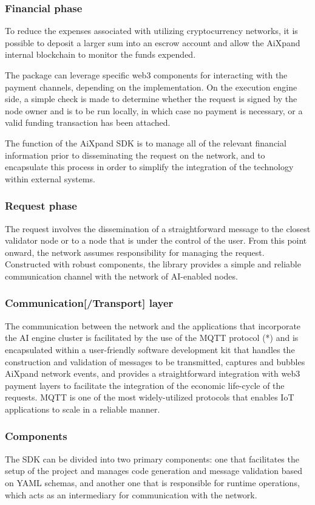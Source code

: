 \documentclass{article}
\begin{document}
\subsubsection{Financial phase}
To reduce the expenses associated with utilizing cryptocurrency networks, it is possible to deposit a larger sum into an escrow account and allow the AiXpand internal blockchain to monitor the funds expended.

The package can leverage specific web3 components for interacting with the payment channels, depending on the implementation. On the execution engine side, a simple check is made to determine whether the request is signed by the node owner and is to be run locally, in which case no payment is necessary, or a valid funding transaction has been attached.

The function of the AiXpand SDK  is to manage all of the relevant financial information prior to disseminating the request on the network, and to encapsulate this process in order to simplify the integration of the technology within external systems.


\subsubsection{Request phase}
The request involves the dissemination of a straightforward message to the closest validator node or to a node that is under the control of the user. From this point onward, the network assumes responsibility for managing the request. Constructed with robust components, the library provides a simple and reliable communication channel with the network of AI-enabled nodes. 

\subsubsection{Communication[/Transport] layer}
The communication between the network and the applications that incorporate the AI engine cluster is facilitated by the use of the MQTT protocol (*) and is encapsulated within a user-friendly software development kit that handles the construction and validation of messages to be transmitted, captures and bubbles AiXpand network events, and provides a straightforward integration with web3 payment layers to facilitate the integration of the economic life-cycle of the requests. MQTT is one of the most widely-utilized protocols that enables IoT applications to scale in a reliable manner.

\subsubsection{Components}
The SDK can be divided into two primary components: one that facilitates the setup of the project and manages code generation and message validation based on YAML schemas, and another one that is responsible for runtime operations, which acts as an intermediary for communication with the network.
\end{document}
